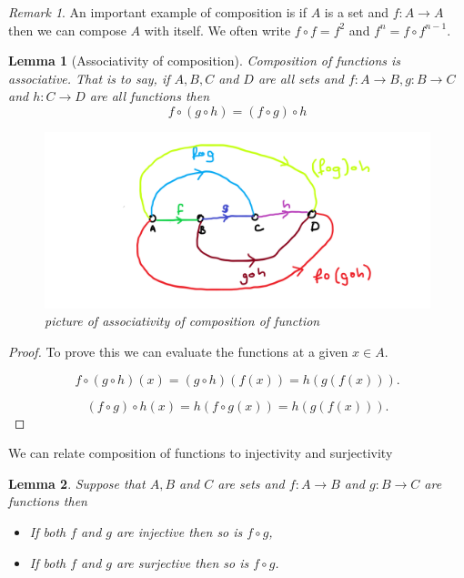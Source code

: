 \documentclass[
]{book}
\newtheorem{lemma}{Lemma}[chapter]
\theoremstyle{definition}
\theoremstyle{definition}
\theoremstyle{definition}
\theoremstyle{definition}
\theoremstyle{remark}
\newtheorem*{remark}{Remark}
\begin{document}
\begin{remark}
An important example of composition is if \(A\) is a set and \(f: A \rightarrow A\) then we can compose \(A\) with itself. We often write \(f\circ f = f^2\) and \(f^n= f\circ f^{n-1}\).
\end{remark}

\begin{lemma}[Associativity of composition]

Composition of functions is associative. That is to say, if \(A,B,C\) and \(D\) are all sets and \(f:A \rightarrow B, g: B \rightarrow C\) and \(h: C \rightarrow D\) are all functions then
\[ f \circ (g \circ h) = (f \circ g) \circ h  \]

\begin{figure}
\centering
\includegraphics{compassoc.png}
\caption{\label{fig:unnamed-chunk-19}picture of associativity of composition of function}
\end{figure}

\end{lemma}

\begin{proof}
To prove this we can evaluate the functions at a given \(x \in A\).

\[f \circ (g \circ h)(x) = (g \circ h)(f(x)) = h(g(f(x))).\]

\[(f\circ g) \circ h(x) = h (f\circ g(x)) = h(g(f(x))).\]
\end{proof}

We can relate composition of functions to injectivity and surjectivity

\begin{lemma}

Suppose that \(A, B\) and \(C\) are sets and \(f: A \rightarrow B\) and \(g: B \rightarrow C\) are functions then

\begin{itemize}
\item
  If both \(f\) and \(g\) are injective then so is \(f \circ g\),
\item
  If both \(f\) and \(g\) are surjective then so is \(f \circ g\).
\end{itemize}

\end{lemma}
\end{document}
